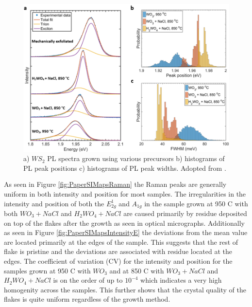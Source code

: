 \begin{figure}[h]
	\begin{center}
		\includegraphics[scale=0.3]{PaperPLSpectraHistograms.png}
		\caption{a) $WS_2$ PL spectra grown using various precursors b) histograms of PL peak positions c) histograms of PL peak widths. Adopted from \cite{Reale2017}.}
		\label{fig:PaperPLSpectraHistograms}
	\end{center}
\end{figure}

As seen in Figure \ref{fig:PaperSIMapsRaman} the Raman peaks are generally uniform in both intensity and position for most samples. The irregularities in the intensity and position of both the $E^1_{2g}$ and $A_{1g}$ in the sample grown at 950 {\degree}C with both $WO_3 + NaCl$ and $H_2WO_4 + NaCl$ are caused primarily by residue deposited on top of the flakes after the growth as seen in optical micrographs. Additionally as seen in Figure \ref{fig:PaperSIMapsIntensityE} the deviations from the mean value are located primarily at the edges of the sample. This suggests that the rest of flake is pristine and the deviations are associated with residue located at the edges. The coefficient of variation (CV) for the intensity and position for the samples grown at 950 {\degree}C with $WO_3$ and at 850 {\degree}C with $WO_3 + NaCl$ and $H_2WO_4 + NaCl$ is on the order of up to $10^{-4}$ which indicates a very high homogenity across the samples. This further shows that the crystal quality of the flakes is quite uniform regardless of the growth method.

